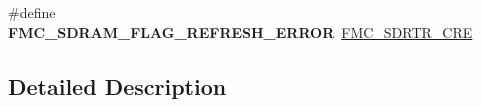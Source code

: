 \begin{DoxyCompactItemize}
\item 
\#define {\bfseries F\+M\+C\+\_\+\+S\+D\+R\+A\+M\+\_\+\+F\+L\+A\+G\+\_\+\+R\+E\+F\+R\+E\+S\+H\+\_\+\+E\+R\+R\+OR}~\hyperlink{group___peripheral___registers___bits___definition_ga81edf1f7343fe344297dd376cd46fc22}{F\+M\+C\+\_\+\+S\+D\+R\+T\+R\+\_\+\+C\+RE}\hypertarget{group___f_m_c___l_l___flag__definition_ga0717e85128c2258f73881c815d4ee59f}{}\label{group___f_m_c___l_l___flag__definition_ga0717e85128c2258f73881c815d4ee59f}

\end{DoxyCompactItemize}


\subsection{Detailed Description}
